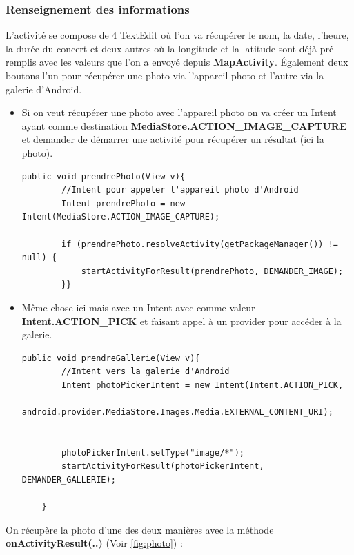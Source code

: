 \documentclass{article}
\begin{document}
\subsubsection{Renseignement des informations}
L'activité se compose de 4 TextEdit où l'on va récupérer le nom, la date, l'heure, la durée du concert et deux autres où la longitude et la latitude sont déjà pré-remplis avec les valeurs que l'on a envoyé depuis \textbf{MapActivity}.
Également deux boutons l'un pour récupérer une photo via l'appareil photo et l'autre via la galerie d'Android.
\begin{itemize}
\item Si on veut récupérer une photo avec l'appareil photo on va créer un Intent ayant comme destination \textbf{MediaStore.ACTION\_IMAGE\_CAPTURE} et demander de démarrer une activité pour récupérer un résultat (ici la photo).
\begin{verbatim}
public void prendrePhoto(View v){
		//Intent pour appeler l'appareil photo d'Android
        Intent prendrePhoto = new Intent(MediaStore.ACTION_IMAGE_CAPTURE);

        if (prendrePhoto.resolveActivity(getPackageManager()) != null) {
            startActivityForResult(prendrePhoto, DEMANDER_IMAGE);
        }}
\end{verbatim} 
\item Même chose ici mais avec un Intent avec comme valeur \textbf{Intent.ACTION\_PICK} et faisant appel à un provider pour accéder à la galerie.
\begin{verbatim}
public void prendreGallerie(View v){
		//Intent vers la galerie d'Android
        Intent photoPickerIntent = new Intent(Intent.ACTION_PICK,
        android.provider.MediaStore.Images.Media.EXTERNAL_CONTENT_URI);
        
        
        photoPickerIntent.setType("image/*");
        startActivityForResult(photoPickerIntent, DEMANDER_GALLERIE);

    }
\end{verbatim}
\end{itemize}
\vspace{1\baselineskip}
On récupère la photo d'une des deux manières avec la méthode \textbf{onActivityResult(..)} (Voir \ref{fig:photo}) : 
\end{document}
